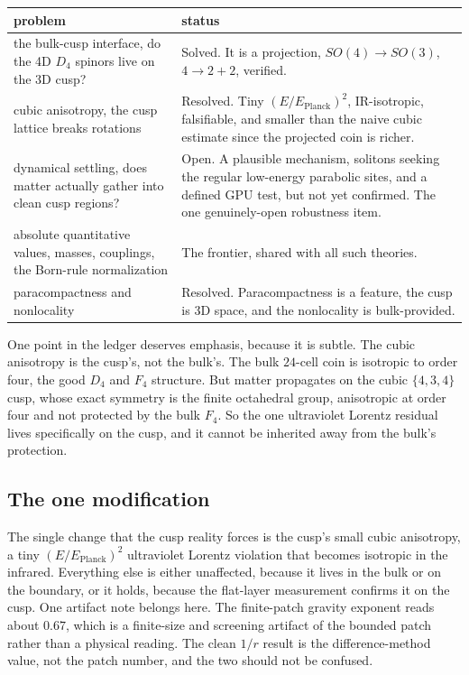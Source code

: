 \begin{table}[h]
\centering
\begin{tabular}{p{}p{}}
\toprule
problem & status \\
\midrule
the bulk-cusp interface, do the 4D $D_4$ spinors live on the 3D cusp? & Solved. It is a projection,
$SO(4) \to SO(3)$, $4 \to 2+2$, verified. \\
\addlinespace
cubic anisotropy, the cusp lattice breaks rotations & Resolved. Tiny $(E/E_{\mathrm{Planck}})^2$, IR-isotropic,
falsifiable, and smaller than the naive cubic estimate since the projected coin is richer. \\
\addlinespace
dynamical settling, does matter actually gather into clean cusp regions? & Open. A plausible mechanism, solitons
seeking the regular low-energy parabolic sites, and a defined GPU test, but not yet confirmed. The one
genuinely-open robustness item. \\
\addlinespace
absolute quantitative values, masses, couplings, the Born-rule normalization & The frontier, shared with all
such theories. \\
\addlinespace
paracompactness and nonlocality & Resolved. Paracompactness is a feature, the cusp is 3D space, and the
nonlocality is bulk-provided. \\
\bottomrule
\end{tabular}
\end{table}

One point in the ledger deserves emphasis, because it is subtle. The cubic anisotropy is the cusp's, not the
bulk's. The bulk $24$-cell coin is isotropic to order four, the good $D_4$ and $F_4$ structure. But matter
propagates on the cubic $\{4,3,4\}$ cusp, whose exact symmetry is the finite octahedral group, anisotropic at
order four and not protected by the bulk $F_4$. So the one ultraviolet Lorentz residual lives specifically on the
cusp, and it cannot be inherited away from the bulk's protection.

\subsection{The one modification}

The single change that the cusp reality forces is the cusp's small cubic anisotropy, a tiny
$(E/E_{\mathrm{Planck}})^2$ ultraviolet Lorentz violation that becomes isotropic in the infrared. Everything else
is either unaffected, because it lives in the bulk or on the boundary, or it holds, because the flat-layer
measurement confirms it on the cusp. One artifact note belongs here. The finite-patch gravity exponent reads
about $0.67$, which is a finite-size and screening artifact of the bounded patch rather than a physical reading.
The clean $1/r$ result is the difference-method value, not the patch number, and the two should not be confused.


